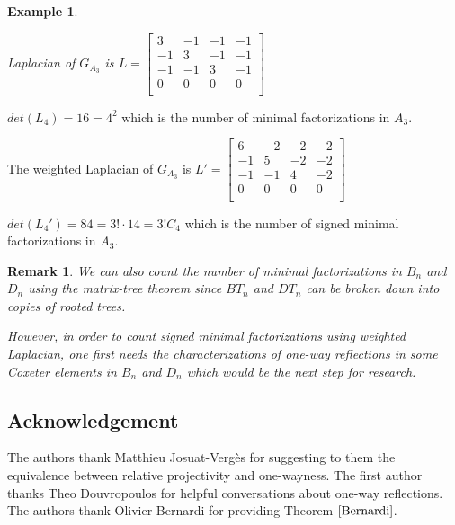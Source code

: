 \documentclass[11pt]{amsart}
\newtheorem{exa}[thm]{Example}%
\newtheorem{rema}[thm]{Remark}%
\begin{document}
\begin{exa}
\begin{center}
\end{center}

Laplacian of $G_{A_3}$ is $L=
\begin{bmatrix}
3 & -1 & -1 & -1\\
-1 & 3 & -1 & -1\\
-1 & -1 & 3 & -1\\
0 & 0 & 0 & 0\\
\end{bmatrix}$
\end{exa}

$det(L_4)=16=4^2$ which is the number of minimal factorizations in $A_3$.

The weighted Laplacian of $G_{A_3}$ is $L'=
\begin{bmatrix}
6 & -2 & -2 & -2\\
-1 & 5 & -2 & -2\\
-1 & -1 & 4 & -2\\
0 & 0 & 0 & 0\\
\end{bmatrix}$

$det(L_4')=84=3!\cdot 14=3!C_4$ which is the number of signed minimal factorizations in $A_3$.

\begin{rema}
    We can also count the number of minimal factorizations in $B_n$ and $D_n$ using the matrix-tree theorem since $BT_n$ and $DT_n$ can be broken down into copies of rooted trees.

    However, in order to count signed minimal factorizations using weighted Laplacian, one first needs the characterizations of one-way reflections in some Coxeter elements in $B_n$ and $D_n$ which would be the next step for research.
\end{rema}







\subsection*{Acknowledgement} The authors thank Matthieu Josuat-Verg\`es for suggesting to them the equivalence between relative projectivity and one-wayness.
The first author thanks Theo Douvropoulos for helpful conversations about one-way reflections. The authors thank Olivier Bernardi for providing Theorem $\ref{Bernardi}$.
\end{document}
